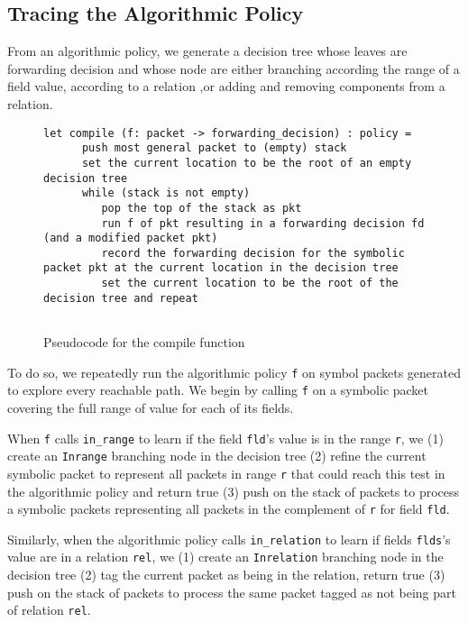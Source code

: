 \documentclass[12pt]{article}
\begin{document}
\subsection*{Tracing the Algorithmic Policy}
From an algorithmic policy, we generate a decision tree  whose leaves are forwarding decision and whose node are either branching according the range of a field value, according to a relation ,or adding and removing components from a relation.

\begin{figure}
\begin{lstlisting}
let compile (f: packet -> forwarding_decision) : policy =
      push most general packet to (empty) stack
      set the current location to be the root of an empty decision tree
      while (stack is not empty)
         pop the top of the stack as pkt
         run f of pkt resulting in a forwarding decision fd (and a modified packet pkt)
         record the forwarding decision for the symbolic packet pkt at the current location in the decision tree
         set the current location to be the root of the decision tree and repeat
  
\end{lstlisting}
\caption{Pseudocode for the compile function}
\end{figure}

To do so, we repeatedly run the algorithmic policy \lstinline|f| on symbol packets generated to explore every reachable path.
We begin by calling \lstinline|f| on a symbolic packet covering the full range of value for each of its fields.

When \lstinline|f| calls \lstinline|in_range| to learn if the field \lstinline|fld|'s value is in the range \lstinline|r|, we (1) create an \lstinline|Inrange| branching node in the decision tree (2) refine the current symbolic packet to represent all packets in range \lstinline|r| that could reach this test in the algorithmic policy and return true (3) push on the stack of packets to process a symbolic packets representing all packets in the complement of \lstinline|r| for field \lstinline|fld|.

Similarly, when the algorithmic policy calls \lstinline|in_relation| to learn if fields \lstinline|flds|'s value are in a relation \lstinline|rel|, we (1) create an \lstinline|Inrelation| branching node in the decision tree (2) tag the current packet as being in the relation, return true (3) push on the stack of packets to process the same packet tagged as not being part of relation \lstinline|rel|.
\end{document}
